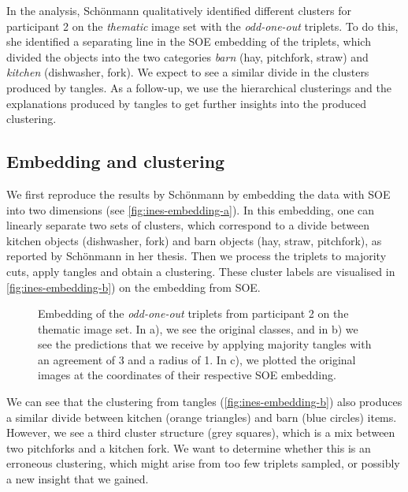 In the analysis, Schönmann qualitatively identified different clusters for participant 2 on the \textit{thematic} image set with the \textit{odd-one-out} triplets. 
To do this, she identified a separating line in the SOE embedding of the triplets, which divided the objects into the two categories \textit{barn} (hay, pitchfork, straw) and 
\textit{kitchen} (dishwasher, fork). We expect to see a similar divide in the clusters produced by tangles. 
As a follow-up, we use the hierarchical clusterings and the explanations produced by tangles to get further insights into the produced clustering. 

\subsection{Embedding and clustering}
We first reproduce the results by Schönmann by embedding the data with SOE into two dimensions 
(see \autoref{fig:ines-embedding-a}). In this embedding, one can linearly separate two sets of clusters, which correspond to a divide between kitchen objects 
(dishwasher, fork) and barn objects (hay, straw, pitchfork), as reported by Schönmann in her thesis. Then we process the triplets to majority cuts, apply tangles 
and obtain a clustering. These cluster labels are visualised in \autoref{fig:ines-embedding-b}) on the embedding from SOE. 

\begin{figure}[h]
    \centering
    \hfill
    \caption{
        Embedding of the \textit{odd-one-out} triplets from participant 2 on the thematic image set.
        In a), we see the original classes, and in b) we see the predictions that we receive by
        applying majority tangles with an agreement of 3 and a radius of 1.
        In c), we plotted the original images at the coordinates of their respective SOE embedding.
    }
    \label{fig:ines-embedding}
\end{figure}

We can see that the clustering from tangles (\autoref{fig:ines-embedding-b}) also produces a similar divide between kitchen (orange triangles) and barn (blue circles) items. 
However, we see a third cluster structure (grey squares), which is a mix between two pitchforks and a kitchen fork. We want to determine whether this is an erroneous clustering, which might arise
from too few triplets sampled, or possibly a new insight that we gained.

